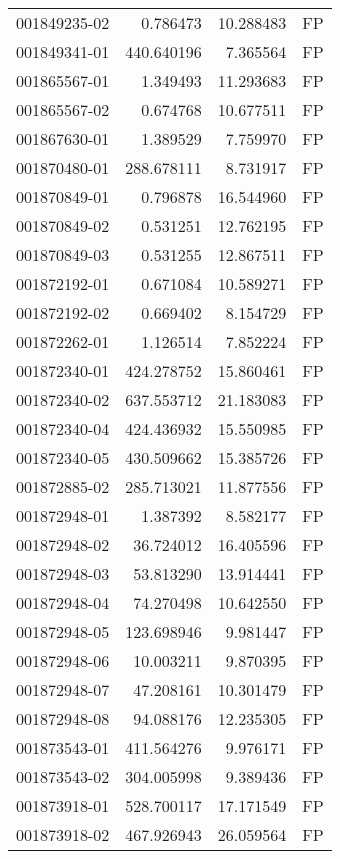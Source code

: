 \begin{tabular}{lrrl}
001849235-02 &    0.786473 &    10.288483 &   FP \\
001849341-01 &  440.640196 &     7.365564 &   FP \\
001865567-01 &    1.349493 &    11.293683 &   FP \\
001865567-02 &    0.674768 &    10.677511 &   FP \\
001867630-01 &    1.389529 &     7.759970 &   FP \\
001870480-01 &  288.678111 &     8.731917 &   FP \\
001870849-01 &    0.796878 &    16.544960 &   FP \\
001870849-02 &    0.531251 &    12.762195 &   FP \\
001870849-03 &    0.531255 &    12.867511 &   FP \\
001872192-01 &    0.671084 &    10.589271 &   FP \\
001872192-02 &    0.669402 &     8.154729 &   FP \\
001872262-01 &    1.126514 &     7.852224 &   FP \\
001872340-01 &  424.278752 &    15.860461 &   FP \\
001872340-02 &  637.553712 &    21.183083 &   FP \\
001872340-04 &  424.436932 &    15.550985 &   FP \\
001872340-05 &  430.509662 &    15.385726 &   FP \\
001872885-02 &  285.713021 &    11.877556 &   FP \\
001872948-01 &    1.387392 &     8.582177 &   FP \\
001872948-02 &   36.724012 &    16.405596 &   FP \\
001872948-03 &   53.813290 &    13.914441 &   FP \\
001872948-04 &   74.270498 &    10.642550 &   FP \\
001872948-05 &  123.698946 &     9.981447 &   FP \\
001872948-06 &   10.003211 &     9.870395 &   FP \\
001872948-07 &   47.208161 &    10.301479 &   FP \\
001872948-08 &   94.088176 &    12.235305 &   FP \\
001873543-01 &  411.564276 &     9.976171 &   FP \\
001873543-02 &  304.005998 &     9.389436 &   FP \\
001873918-01 &  528.700117 &    17.171549 &   FP \\
001873918-02 &  467.926943 &    26.059564 &   FP \\

\end{tabular}
